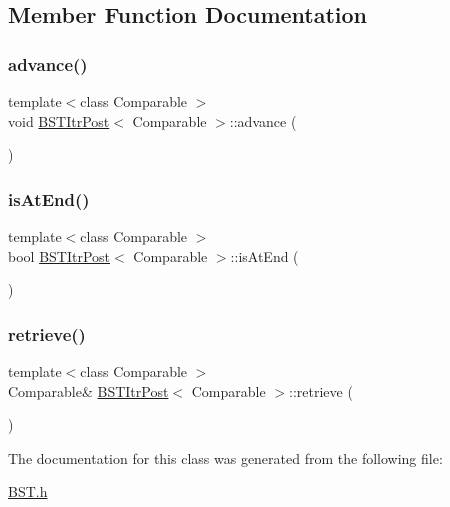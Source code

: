 \subsection{Member Function Documentation}
\mbox{\label{class_b_s_t_itr_post_a376098e5a82cd02118dd4dcdec49bb26}} 
\subsubsection{\texorpdfstring{advance()}{advance()}}
{\footnotesize\ttfamily template$<$class Comparable $>$ \\
void \hyperlink{class_b_s_t_itr_post}{B\+S\+T\+Itr\+Post}$<$ Comparable $>$\+::advance (\begin{DoxyParamCaption}{ }\end{DoxyParamCaption})}

\mbox{\label{class_b_s_t_itr_post_a2f330e73bb817e8bd1c797805e66ddb7}} 
\subsubsection{\texorpdfstring{is\+At\+End()}{isAtEnd()}}
{\footnotesize\ttfamily template$<$class Comparable $>$ \\
bool \hyperlink{class_b_s_t_itr_post}{B\+S\+T\+Itr\+Post}$<$ Comparable $>$\+::is\+At\+End (\begin{DoxyParamCaption}{ }\end{DoxyParamCaption})\hspace{0.3cm}{\ttfamily [inline]}}

\mbox{\label{class_b_s_t_itr_post_a72446e4d0df0bcafc14294a78faeb56e}} 
\subsubsection{\texorpdfstring{retrieve()}{retrieve()}}
{\footnotesize\ttfamily template$<$class Comparable $>$ \\
Comparable\& \hyperlink{class_b_s_t_itr_post}{B\+S\+T\+Itr\+Post}$<$ Comparable $>$\+::retrieve (\begin{DoxyParamCaption}{ }\end{DoxyParamCaption})\hspace{0.3cm}{\ttfamily [inline]}}



The documentation for this class was generated from the following file\+:\begin{DoxyCompactItemize}
\item 
\hyperlink{_b_s_t_8h}{B\+S\+T.\+h}\end{DoxyCompactItemize}
